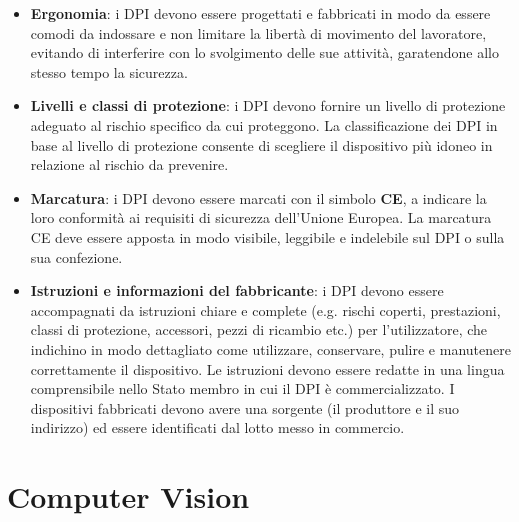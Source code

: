 \begin{itemize}
    \item \textbf{Ergonomia}: i DPI devono essere progettati e fabbricati in modo da essere comodi da indossare e non limitare la libertà di movimento del lavoratore, evitando di interferire con lo svolgimento delle sue attività, garatendone allo stesso tempo la sicurezza. 
    
    \item \textbf{Livelli e classi di protezione}: i DPI devono fornire un livello di protezione adeguato al rischio specifico da cui proteggono. La classificazione dei DPI in base al livello di protezione consente di scegliere il dispositivo più idoneo in relazione al rischio da prevenire.
    
    \item \textbf{Marcatura}: i DPI devono essere marcati con il simbolo \textbf{CE}, a indicare la loro conformità ai requisiti di sicurezza dell'Unione Europea. La marcatura CE deve essere apposta in modo visibile, leggibile e indelebile sul DPI o sulla sua confezione.

    \item \textbf{Istruzioni e informazioni del fabbricante}: i DPI devono essere accompagnati da istruzioni chiare e complete (e.g. rischi coperti, prestazioni, classi di protezione, accessori, pezzi di ricambio etc.) per l'utilizzatore, che indichino in modo dettagliato come utilizzare, conservare, pulire e manutenere correttamente il dispositivo. Le istruzioni devono essere redatte in una lingua comprensibile nello Stato membro in cui il DPI è commercializzato. I dispositivi fabbricati devono avere una sorgente (il produttore e il suo indirizzo) ed essere identificati dal lotto messo in commercio.
\end{itemize} 

\section{Computer Vision}

